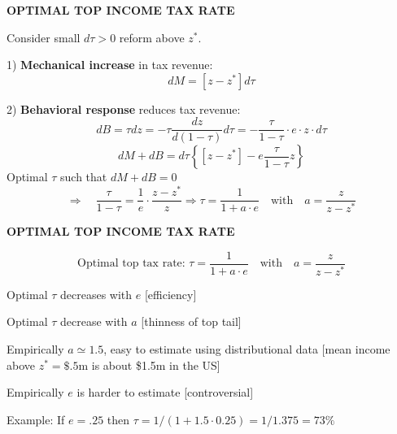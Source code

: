 \documentclass[landscape]{slides}
\begin{document}
\begin{slide}
\begin{center}
{\bf OPTIMAL TOP INCOME TAX RATE}
\end{center}
Consider small $d\tau>0$ reform above $z^*$.

1) {\bf Mechanical increase} in tax revenue:
\[ dM=
[z-z^*] d\tau \]

2) {\bf Behavioral response} reduces tax revenue:
\[ dB= \tau dz= - \tau \frac{dz}{d(1-\tau)}d\tau = -
 \frac{\tau}{1-\tau} \cdot  e \cdot z \cdot d\tau \]
\[ dM+dB=d\tau \left \{ [z-z^*]   - e
\frac{\tau}{1-\tau} z \right \}\]
Optimal $\tau$ such that
$dM+dB=0$ 
\[ \Rightarrow \quad \frac{\tau}{1-\tau}=\frac{1}{e} \cdot \frac{z-z^*}{z} \Rightarrow 
\tau=\frac{1}{1+a \cdot e} \quad \mathrm{with} \quad
a=\frac{z}{z-z^*}\]


\end{slide}
\begin{slide}
\begin{center}
{\bf OPTIMAL TOP INCOME TAX RATE}
\end{center}
$$\text{Optimal top tax rate: } \tau=\frac{1}{1+a \cdot e} \quad \mathrm{with} \quad
a=\frac{z}{z-z^*}$$

Optimal $\tau$ decreases with $e$ [efficiency]

Optimal $\tau$ decrease with $a$ [thinness of top tail]

Empirically $a \simeq 1.5$, easy to estimate using distributional data
[mean income above $z^*=\$.5$m is about \$1.5m in the US]

Empirically $e$ is harder to estimate [controversial]

Example: If $e=.25$ then $\tau=1/(1+1.5\cdot 0.25)=1/1.375=73\%$

\end{slide}

%
\end{document}
